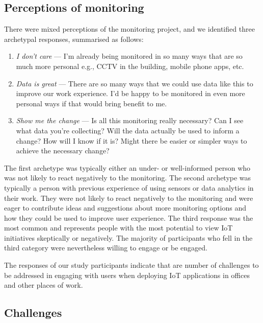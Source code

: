 \subsection{Perceptions of monitoring}
\label{sec:perc-monit}
There were mixed perceptions of the monitoring project, and we
identified three archetypal responses, summarised as follows: 

\begin{enumerate}
\item \textit{I don't care} --- I'm already being monitored in so many ways
  that are so much more personal e.g., CCTV in the building, mobile
  phone apps, etc. 
\item \textit{Data is great} --- There are so many ways that we could use
  data like this to improve our work experience. I'd
  be happy to be monitored in even more personal ways if that would
  bring benefit to me. 
\item \textit{Show me the change} --- Is all this monitoring really necessary?
  Can I see what data you’re collecting? Will the data actually be
  used to inform a change? How will I know if it is? Might there be
  easier or simpler ways to achieve the necessary change? 
\end{enumerate}

The first archetype was typically either an under- or well-informed
person who was not likely to react negatively to the monitoring. The
second archetype was typically a person with previous experience of
using sensors or data analytics in their work. They were not likely to
react negatively to the monitoring and were eager to contribute ideas
and suggestions about more monitoring options and how they could be
used to improve user experience. The third response was the most
common and represents people with the most potential to view IoT
initiatives skeptically or negatively. The majority of participants
who fell in the third category were nevertheless willing to engage or
be engaged.

The responses of our study participants
indicate that are number of challenges to be addressed in engaging
with users when deploying IoT applications in offices and other
places of work. 

\subsection{Challenges}
\label{sec:challenges}


